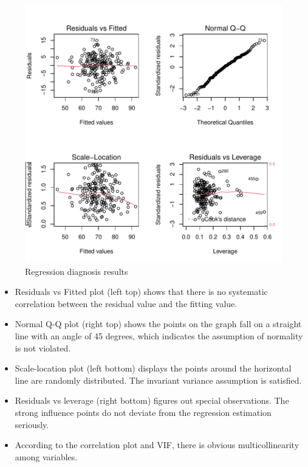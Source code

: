 \documentclass[
]{article}
\begin{document}
\begin{figure}[H]

{\centering \includegraphics{RMD-Group-28_files/figure-latex/unnamed-chunk-7-1} 

}

\caption{\label{fig:dia} Regression diagnosis results}\label{fig:unnamed-chunk-7}
\end{figure}

\begin{itemize}
\item
  Residuals vs Fitted plot (left top) shows that there is no systematic
  correlation between the residual value and the fitting value.
\item
  Normal Q-Q plot (right top) shows the points on the graph fall on a
  straight line with an angle of 45 degrees, which indicates the
  assumption of normality is not violated.
\item
  Scale-location plot (left bottom) displays the points around the
  horizontal line are randomly distributed. The invariant variance
  assumption is satisfied.
\item
  Residuals vs leverage (right bottom) figures out special observations.
  The strong influence points do not deviate from the regression
  estimation seriously.
\item
  According to the correlation plot and VIF, there is obvious
  multicollinearity among variables.
\end{itemize}
\end{document}
